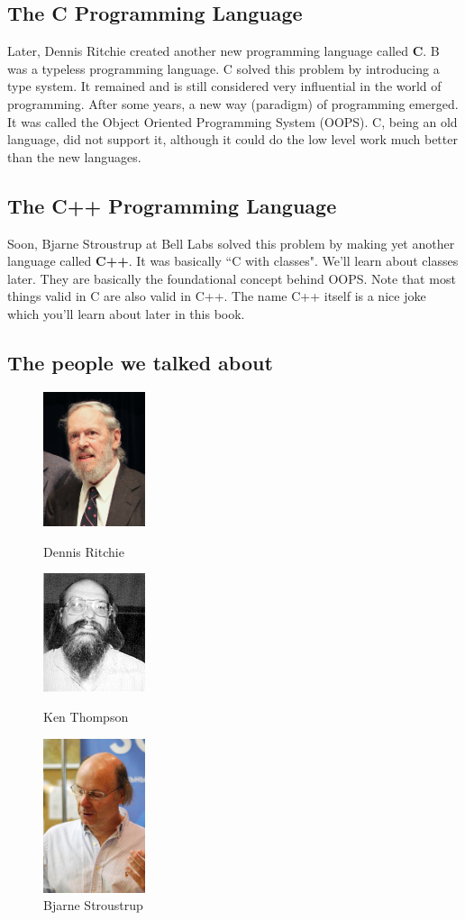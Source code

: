 \documentclass[letterpaper, 12pt]{book}
\begin{document}
\subsection{The C Programming Language}
Later, Dennis Ritchie created another new programming language called \textbf{C}. B was a typeless programming language. C solved this problem by introducing a type system. It remained and is still considered very influential in the world of programming. After some years, a new way (paradigm) of programming emerged. It was called the Object Oriented Programming System (OOPS). C, being an old language, did not support it, although it could do the low level work much better than the new languages.
\subsection{The C++ Programming Language}
Soon, Bjarne Stroustrup at Bell Labs solved this problem by making yet another language called \textbf{C++}. It was basically ``C with classes". We'll learn about classes later. They are basically the foundational concept behind OOPS. Note that most things valid in C are also valid in C++. The name C++ itself is a nice joke which you'll learn about later in this book.
\pagebreak
\subsection{The people we talked about}
\begin{figure}[h]
\centering
\includegraphics[width=3cm]{img/ritchie}
\caption{Dennis Ritchie}\label{ritchie}
\includegraphics[width=3cm]{img/kenthompson}
\caption{Ken Thompson}\label{kenthompson}
\includegraphics[width=3cm]{img/stroustrup}
\caption{Bjarne Stroustrup}\label{stroustrup}
\end{figure}
\end{document}
